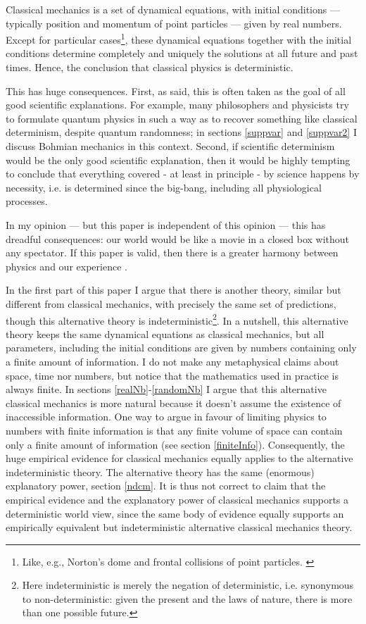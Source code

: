 \documentclass[floatfix,12pt]{article}
\begin{document}
Classical mechanics is a set of dynamical equations, with initial conditions --- typically position and momentum of point particles --- given by real numbers. Except for particular cases\footnote{Like, e.g., Norton's dome \cite{NortonDome} and frontal collisions of point particles. \label{FN1}}, these dynamical equations together with the initial conditions determine completely and uniquely the solutions at all future and past times. Hence, the conclusion that classical physics is deterministic.

This has huge consequences. First, as said, this is often taken as the goal of all good scientific explanations. For example, many philosophers and physicists try to formulate quantum physics in such a way as to recover something like classical determinism, despite quantum randomness; in sections \ref{suppvar} and \ref{suppvar2} I discuss Bohmian mechanics in this context. Second, if scientific determinism would be the only good scientific explanation, then it would be highly tempting to conclude that everything covered - at least in principle - by science happens by necessity, i.e. is determined since the big-bang, including all physiological processes.

In my opinion --- but this paper is independent of this opinion --- this has dreadful consequences: 
our world would be like a movie in a closed box without any spectator. 
If this paper is valid, then there is a greater harmony between physics and our experience \cite{DolevHarmony}.

In the first part of this paper I argue that there is another theory, similar but different from classical mechanics, with precisely the same set of predictions, though this alternative theory is indeterministic\footnote{Here indeterministic is merely the negation of deterministic, i.e. synonymous to non-deterministic: given the present and the laws of nature, there is more than one possible future.}. In a nutshell, this alternative theory keeps the same dynamical equations as classical mechanics, but all parameters, including the initial conditions are given by numbers containing only a finite amount of information. I do not make any metaphysical claims about space, time nor numbers, but notice that the mathematics used in practice is always finite. In sections \ref{realNb}-\ref{randomNb} I argue that this alternative classical mechanics is more natural because it doesn't assume the existence of inaccessible information. One way to argue in favour of limiting physics to numbers with finite information is that any finite volume of space can contain only a finite amount of information (see section \ref{finiteInfo}). Consequently, the huge empirical evidence for classical mechanics equally applies to the alternative indeterministic theory. The alternative theory has the same (enormous) explanatory power, section \ref{ndcm}. It is thus not correct to claim that the empirical evidence and the explanatory power of classical mechanics supports a deterministic world view, since the same body of evidence equally supports an empirically equivalent but indeterministic alternative classical mechanics theory.
\end{document}

